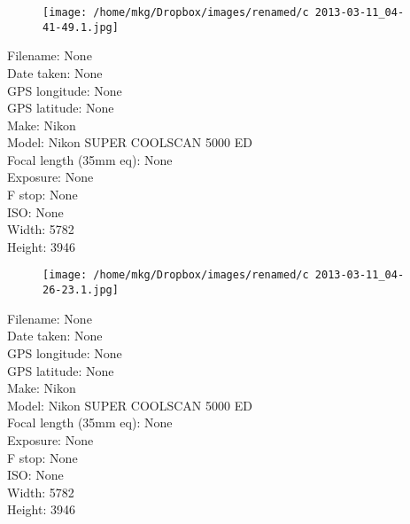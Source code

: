 \clearpage
\recalctypearea
\newpage
\noindent
\begin{figure}
    \texttt{[image: /home/mkg/Dropbox/images/renamed/c 2013-03-11\_04-41-49.1.jpg]}
\end{figure}

\clearpage
\recalctypearea
\newpage
\noindent
Filename: None\\ 
Date taken: None\\ 
GPS longitude: None\\ 
GPS latitude: None\\ 
Make: Nikon\\ 
Model: Nikon SUPER COOLSCAN 5000 ED\\ 
Focal length (35mm eq): None\\ 
Exposure: None\\ 
F stop: None\\ 
ISO: None\\ 
Width: 5782\\ 
Height: 3946\\ 

\clearpage
\recalctypearea
\newpage
\noindent
\begin{figure}
    \texttt{[image: /home/mkg/Dropbox/images/renamed/c 2013-03-11\_04-26-23.1.jpg]}
\end{figure}

\clearpage
\recalctypearea
\newpage
\noindent
Filename: None\\ 
Date taken: None\\ 
GPS longitude: None\\ 
GPS latitude: None\\ 
Make: Nikon\\ 
Model: Nikon SUPER COOLSCAN 5000 ED\\ 
Focal length (35mm eq): None\\ 
Exposure: None\\ 
F stop: None\\ 
ISO: None\\ 
Width: 5782\\ 
Height: 3946\\ 

